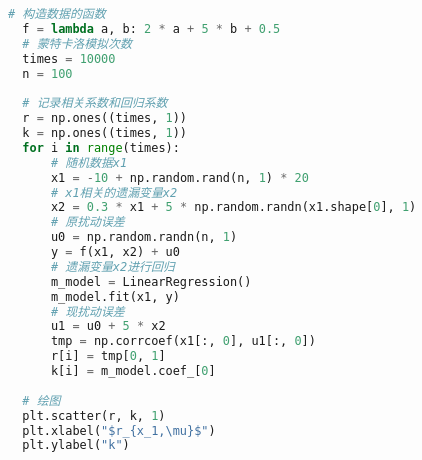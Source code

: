 \documentclass[withoutpreface]{cumcmthesis}
\begin{document}
  \begin{lstlisting}[language=python ,caption={蒙特卡洛模拟探究内生性} ]
  # 构造数据的函数
  f = lambda a, b: 2 * a + 5 * b + 0.5
  # 蒙特卡洛模拟次数
  times = 10000
  n = 100
  
  # 记录相关系数和回归系数
  r = np.ones((times, 1))
  k = np.ones((times, 1))
  for i in range(times):
      # 随机数据x1
      x1 = -10 + np.random.rand(n, 1) * 20
      # x1相关的遗漏变量x2
      x2 = 0.3 * x1 + 5 * np.random.randn(x1.shape[0], 1)
      # 原扰动误差
      u0 = np.random.randn(n, 1)
      y = f(x1, x2) + u0
      # 遗漏变量x2进行回归
      m_model = LinearRegression()
      m_model.fit(x1, y)
      # 现扰动误差
      u1 = u0 + 5 * x2
      tmp = np.corrcoef(x1[:, 0], u1[:, 0])
      r[i] = tmp[0, 1]
      k[i] = m_model.coef_[0]
  
  # 绘图
  plt.scatter(r, k, 1)
  plt.xlabel("$r_{x_1,\mu}$")
  plt.ylabel("k")
  \end{lstlisting}
\end{document}
